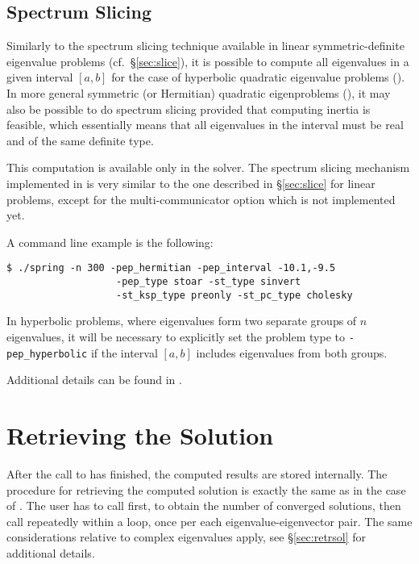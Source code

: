 \subsection{\label{sec:qslice}Spectrum Slicing}

Similarly to the spectrum slicing technique available in linear symmetric-definite eigenvalue problems (cf.\ \S\ref{sec:slice}), it is possible to compute all eigenvalues in a given interval $[a,b]$ for the case of hyperbolic quadratic eigenvalue problems (). In more general symmetric (or Hermitian) quadratic eigenproblems (), it may also be possible to do spectrum slicing provided that computing inertia is feasible, which essentially means that all eigenvalues in the interval must be real and of the same definite type.

This computation is available only in the  solver.
The spectrum slicing mechanism implemented in  is very similar to the one described in \S\ref{sec:slice} for linear problems, except for the multi-communicator option which is not implemented yet.

A command line example is the following:
\begin{Verbatim}[fontsize=\small]
	$ ./spring -n 300 -pep_hermitian -pep_interval -10.1,-9.5
                   -pep_type stoar -st_type sinvert
                   -st_ksp_type preonly -st_pc_type cholesky
\end{Verbatim}

In hyperbolic problems, where eigenvalues form two separate groups of $n$ eigenvalues, it will be necessary to explicitly set the problem type to \texttt{-pep\_hyperbolic} if the interval $[a,b]$ includes eigenvalues from both groups.

Additional details can be found in \citep{Campos:2020:ISS}.

\section{Retrieving the Solution}

After the call to  has finished, the computed results are stored internally. The procedure for retrieving the computed solution is exactly the same as in the case of . The user has to call  first, to obtain the number of converged solutions, then call  repeatedly within a loop, once per each eigenvalue-eigenvector pair. The same considerations relative to complex eigenvalues apply, see \S\ref{sec:retrsol} for additional details.

